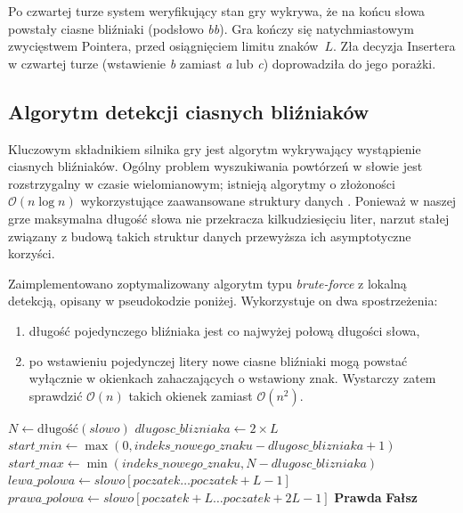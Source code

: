 \documentclass{article}
\begin{document}
Po czwartej turze system weryfikujący stan gry wykrywa, że na końcu słowa
powstały ciasne bliźniaki (podsłowo \textit{bb}). Gra kończy się
natychmiastowym zwycięstwem Pointera, przed osiągnięciem limitu znaków~$L$.
Zła decyzja Insertera w czwartej turze (wstawienie \textit{b} zamiast
\textit{a} lub \textit{c}) doprowadziła do jego porażki.

\subsection{Algorytm detekcji ciasnych bliźniaków}

Kluczowym składnikiem silnika gry jest algorytm wykrywający wystąpienie
ciasnych bliźniaków. Ogólny problem wyszukiwania powtórzeń w słowie jest
rozstrzygalny w czasie wielomianowym; istnieją algorytmy o złożoności
$\mathcal{O}(n\log n)$ wykorzystujące zaawansowane struktury danych
\cite{Lothaire2002}. Ponieważ w naszej grze maksymalna długość słowa nie
przekracza kilkudziesięciu liter, narzut stałej związany z budową takich
struktur danych przewyższa ich asymptotyczne korzyści.

Zaimplementowano zoptymalizowany algorytm typu \textit{brute-force}
z lokalną detekcją, opisany w pseudokodzie poniżej. Wykorzystuje on dwa
spostrzeżenia:
\begin{enumerate}
    \item długość pojedynczego bliźniaka jest co najwyżej połową długości
    słowa,
    \item po wstawieniu pojedynczej litery nowe ciasne bliźniaki mogą
    powstać wyłącznie w okienkach zahaczających o wstawiony znak.
    Wystarczy zatem sprawdzić $\mathcal{O}(n)$ takich okienek zamiast
    $\mathcal{O}(n^2)$.
\end{enumerate}

\begin{algorithm}[H]
\caption{Lokalna detekcja ciasnych bliźniaków}
\begin{algorithmic}[1]
    \State $N \gets \text{długość}(slowo)$
        \State $dlugosc\_blizniaka \gets 2 \times L$
        \State $start\_min \gets \max(0, indeks\_nowego\_znaku - dlugosc\_blizniaka + 1)$
        \State $start\_max \gets \min(indeks\_nowego\_znaku, N - dlugosc\_blizniaka)$
            \State $lewa\_polowa \gets slowo[poczatek \dots poczatek + L - 1]$
            \State $prawa\_polowa \gets slowo[poczatek + L \dots poczatek + 2L - 1]$
                \State \Return \textbf{Prawda}
            \EndIf
        \EndFor
    \EndFor
    \State \Return \textbf{Fałsz}
\EndFunction
\end{algorithmic}
\end{algorithm}
\end{document}
